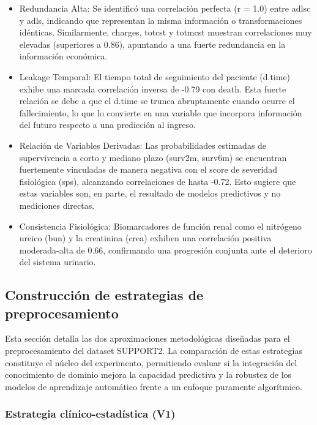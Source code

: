 \begin{itemize}
  \item Redundancia Alta: Se identificó una correlación perfecta (r = 1.0) entre
    adlsc y adls, indicando que representan la misma información o
    transformaciones idénticas. Similarmente, charges, totcst y totmcst muestran
    correlaciones muy elevadas (superiores a 0.86), apuntando a una fuerte
    redundancia en la información económica.
  \item Leakage Temporal: El tiempo total de seguimiento del paciente (d.time)
    exhibe una marcada correlación inversa de -0.79 con death. Esta fuerte
    relación se debe a que el d.time se trunca abruptamente cuando ocurre el
    fallecimiento, lo que lo convierte en una variable que incorpora información
    del futuro respecto a una predicción al ingreso.
  \item Relación de Variables Derivadas: Las probabilidades estimadas de
    supervivencia a corto y mediano plazo (surv2m, surv6m) se encuentran
    fuertemente vinculadas de manera negativa con el score de severidad
    fisiológica (sps), alcanzando correlaciones de hasta -0.72. Esto sugiere
    que estas variables son, en parte, el resultado de modelos predictivos y no
    mediciones directas.
  \item Consistencia Fisiológica: Biomarcadores de función renal como el nitrógeno
    ureico (bun) y la creatinina (crea) exhiben una correlación positiva
    moderada-alta de 0.66, confirmando una progresión conjunta ante el deterioro
    del sistema urinario.
\end{itemize}

\subsection{Construcción de estrategias de preprocesamiento}

Esta sección detalla las dos aproximaciones metodológicas diseñadas para el
preprocesamiento del dataset SUPPORT2. La comparación de estas estrategias
constituye el núcleo del experimento, permitiendo evaluar si la integración del
conocimiento de dominio mejora la capacidad predictiva y la robustez de los
modelos de aprendizaje automático frente a un enfoque puramente algorítmico.

\subsubsection{Estrategia clínico-estadística (V1)}

